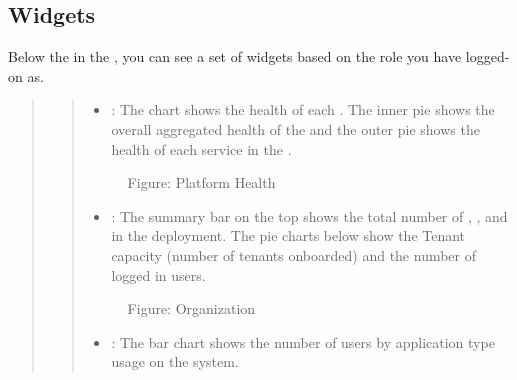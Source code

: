 \documentclass[letterpaper,10pt,english]{sphinxmanual}
\begin{document}
\subsection{Widgets}
\label{\detokenize{loom_getting_started_guide:widgets}}
Below the  in the , you can see a set of widgets based on the role you have logged-on as.
\begin{quote}
\begin{quote}
\begin{itemize}
\item {} 
: The chart shows the health of each . The inner pie shows the overall aggregated health of the  and the outer pie shows the health of each service in the .

\end{itemize}

\begin{figure}[htbp]
\centering
\capstart

\noindent{}
\caption{Figure: Platform Health}\label{\detokenize{loom_getting_started_guide:id21}}\end{figure}
\begin{itemize}
\item {} 
: The summary bar on the top shows the total number of , ,  and  in the deployment. The pie charts below show the Tenant capacity (number of tenants onboarded) and the number of logged in users.

\end{itemize}

\begin{figure}[htbp]
\centering
\capstart

\noindent{}
\caption{Figure: Organization}\label{\detokenize{loom_getting_started_guide:id22}}\end{figure}
\begin{itemize}
\item {} 
: The bar chart shows the number of users by application type usage on the system.

\end{itemize}


\end{quote}
\end{quote}
\end{document}
